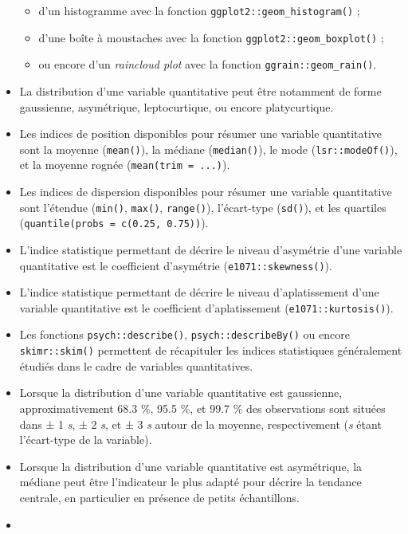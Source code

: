 \documentclass[
  letterpaper,
]{book}
\providecommand{\tightlist}{%
  \setlength{\itemsep}{0pt}\setlength{\parskip}{0pt}}\usepackage{longtable,booktabs,array}
\begin{document}
\begin{itemize}
  \begin{itemize}
  \tightlist
  \item
    d'un histogramme avec la fonction
    \texttt{ggplot2::geom\_histogram()} ;
  \item
    d'une boîte à moustaches avec la fonction
    \texttt{ggplot2::geom\_boxplot()} ;
  \item
    ou encore d'un \emph{raincloud plot} avec la fonction
    \texttt{ggrain::geom\_rain()}.
  \end{itemize}
\item
  La distribution d'une variable quantitative peut être notamment de
  forme gaussienne, asymétrique, leptocurtique, ou encore platycurtique.
\item
  Les indices de position disponibles pour résumer une variable
  quantitative sont la moyenne (\texttt{mean()}), la médiane
  (\texttt{median()}), le mode (\texttt{lsr::modeOf()}), et la moyenne
  rognée (\texttt{mean(trim\ =\ ...)}).
\item
  Les indices de dispersion disponibles pour résumer une variable
  quantitative sont l'étendue (\texttt{min()}, \texttt{max()},
  \texttt{range()}), l'écart-type (\texttt{sd()}), et les quartiles
  (\texttt{quantile(probs\ =\ c(0.25,\ 0.75))}).
\item
  L'indice statistique permettant de décrire le niveau d'asymétrie d'une
  variable quantitative est le coefficient d'asymétrie
  (\texttt{e1071::skewness()}).
\item
  L'indice statistique permettant de décrire le niveau d'aplatissement
  d'une variable quantitative est le coefficient d'aplatissement
  (\texttt{e1071::kurtosis()}).
\item
  Les fonctions \texttt{psych::describe()}, \texttt{psych::describeBy()}
  ou encore \texttt{skimr::skim()} permettent de récapituler les indices
  statistiques généralement étudiés dans le cadre de variables
  quantitatives.
\item
  Lorsque la distribution d'une variable quantitative est gaussienne,
  approximativement 68.3 \%, 95.5 \%, et 99.7 \% des observations sont
  situées dans ± 1 \emph{s}, ± 2 \emph{s}, et ± 3 \emph{s} autour de la
  moyenne, respectivement (\emph{s} étant l'écart-type de la variable).
\item
  Lorsque la distribution d'une variable quantitative est asymétrique,
  la médiane peut être l'indicateur le plus adapté pour décrire la
  tendance centrale, en particulier en présence de petits échantillons.
\item

\end{itemize}
\end{document}
